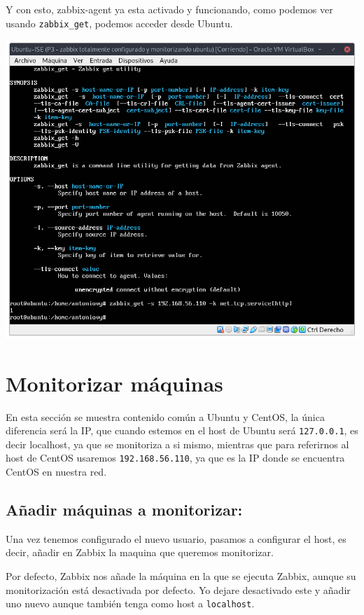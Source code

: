 \documentclass[12pt, spanish]{article}
\begin{document}
Y con esto, zabbix-agent ya esta activado y funcionando, como podemos ver usando \texttt{zabbix\_get}, podemos acceder desde Ubuntu.
\begin{center}
\includegraphics[scale=0.25]{zabbix_get.png}
\end{center}



\section{Monitorizar máquinas}

En esta sección se muestra contenido común a Ubuntu y CentOS, la única diferencia será la IP, que cuando estemos en el host de Ubuntu será \texttt{127.0.0.1}, es decir localhost, ya que se monitoriza a si mismo, mientras que para referirnos al host de CentOS usaremos \texttt{192.168.56.110}, ya que es la IP donde se encuentra CentOS en nuestra red.


\subsection{Añadir máquinas a monitorizar:}

Una vez tenemos configurado el nuevo usuario, pasamos a configurar el host, es decir, añadir en Zabbix la maquina que queremos monitorizar.

Por defecto, Zabbix nos añade la máquina en la que se ejecuta Zabbix, aunque su monitorización está desactivada por defecto. Yo dejare desactivado este y añadir uno nuevo aunque también tenga como host a \texttt{localhost}.
\end{document}
